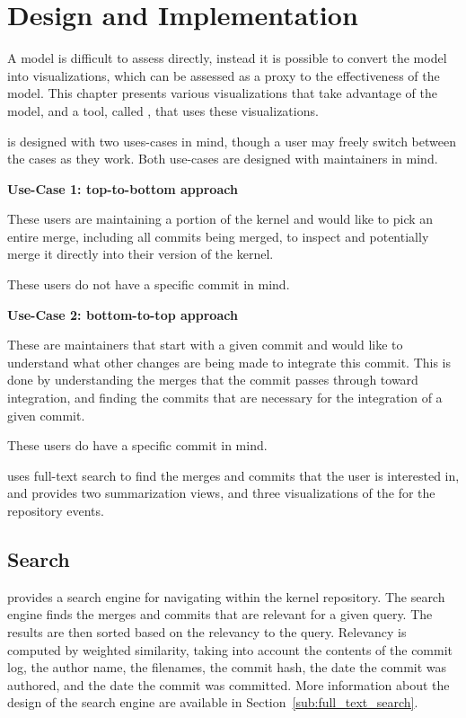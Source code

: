 \chapter{Design and Implementation}\label{chap:design_and_implementation}

A model is difficult to assess directly, instead it is possible to
convert the model into visualizations, which can be assessed as a proxy
to the effectiveness of the model. This chapter presents various
visualizations that take advantage of the \mt{} model, and a tool,
called \tool{}, that uses these visualizations.

\tool{} is designed with two uses-cases in mind, though a user may
freely switch between the cases as they work. Both use-cases are
designed with maintainers in mind.

\begin{textbox}
  \textbf{Use-Case 1: top-to-bottom approach}

  These users are maintaining a portion of the kernel and would like to
  pick an entire merge, including all commits being merged,
  to inspect and potentially merge it directly into their version of the
  kernel.

  These users do not have a specific commit in mind.
\end{textbox}

\begin{textbox}
  \textbf{Use-Case 2: bottom-to-top approach}

  These are maintainers that start with a given commit and would like to
  understand what other changes are being made to integrate this commit.
  This is done by understanding the merges that the commit passes
  through toward integration, and finding the commits that are necessary
  for the integration of a given commit.

  These users do have a specific commit in mind.
\end{textbox}

\tool{} uses full-text search to find the merges and commits that the
user is interested in, and provides two summarization views,
and three visualizations of the \mt{} for the repository events.

\section{Search}\label{sec:search}

\tool{} provides a search engine for navigating within the kernel
repository.
The search engine finds the merges and commits that are relevant for a
given query.
The results are then sorted based on the relevancy to the query.
Relevancy is computed by weighted similarity, taking into account the
contents of the commit log,
the author name, the filenames, the commit hash, the date the commit was
authored, and the date the commit was committed.
More information about the design of the search engine are available in
Section~\ref{sub:full_text_search}.

